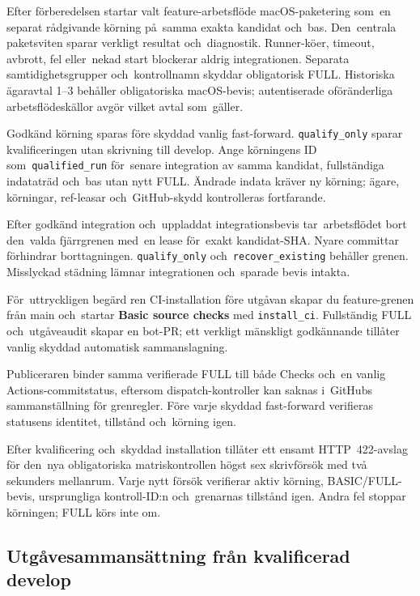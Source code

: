 \documentclass[11pt,a4paper]{article}
\newcommand{\ui}[1]{\textbf{#1}}
\newcommand{\codeword}[1]{\nolinkurl{#1}}
\begin{document}
Efter förberedelsen startar valt feature-arbetsflöde macOS-paketering som~en
separat rådgivande körning på~samma exakta kandidat och~bas. Den~centrala
paketsviten sparar verkligt resultat och~diagnostik. Runner-köer, timeout,
avbrott, fel eller~nekad start blockerar aldrig integrationen. Separata
samtidighetsgrupper och~kontrollnamn skyddar obligatorisk FULL. Historiska
ägaravtal 1--3 behåller obligatoriska macOS-bevis; autentiserade oföränderliga
arbetsflödeskällor avgör vilket avtal som~gäller.

Godkänd körning sparas före skyddad vanlig fast-forward.
\codeword{qualify_only} sparar kvalificeringen utan skrivning till develop.
Ange körningens ID som~\codeword{qualified_run} för~senare integration av
samma kandidat, fullständiga indataträd och~bas utan nytt FULL.
Ändrade indata kräver ny körning; ägare, körningar, ref-leasar och~GitHub-skydd
kontrolleras fortfarande.

Efter godkänd integration och~uppladdat integrationsbevis tar~arbetsflödet bort
den~valda fjärrgrenen med~en lease för~exakt kandidat-SHA. Nyare committar
förhindrar borttagningen. \codeword{qualify_only}
och~\codeword{recover_existing}
behåller grenen. Misslyckad städning lämnar integrationen och~sparade bevis
intakta.

För~uttryckligen begärd ren CI-installation före utgåvan skapar du
feature-grenen från main och~startar \ui{Basic source checks} med
\codeword{install_ci}. Fullständig FULL och~utgåveaudit skapar en bot-PR;
ett verkligt mänskligt godkännande tillåter vanlig skyddad automatisk
sammanslagning.

Publiceraren binder samma verifierade FULL till både Checks och~en vanlig
Actions-commitstatus, eftersom dispatch-kontroller kan saknas i~GitHubs
sammanställning för grenregler. Före varje skyddad fast-forward verifieras
statusens identitet, tillstånd och~körning igen.

Efter kvalificering och~skyddad installation tillåter ett ensamt HTTP~422-avslag
för den~nya obligatoriska matriskontrollen högst sex skrivförsök med två
sekunders
mellanrum. Varje nytt försök verifierar aktiv körning, BASIC/FULL-bevis,
ursprungliga kontroll-ID:n och~grenarnas tillstånd igen. Andra fel stoppar
körningen; FULL körs inte om.

\subsection{Utgåvesammansättning från kvalificerad develop}
\end{document}
